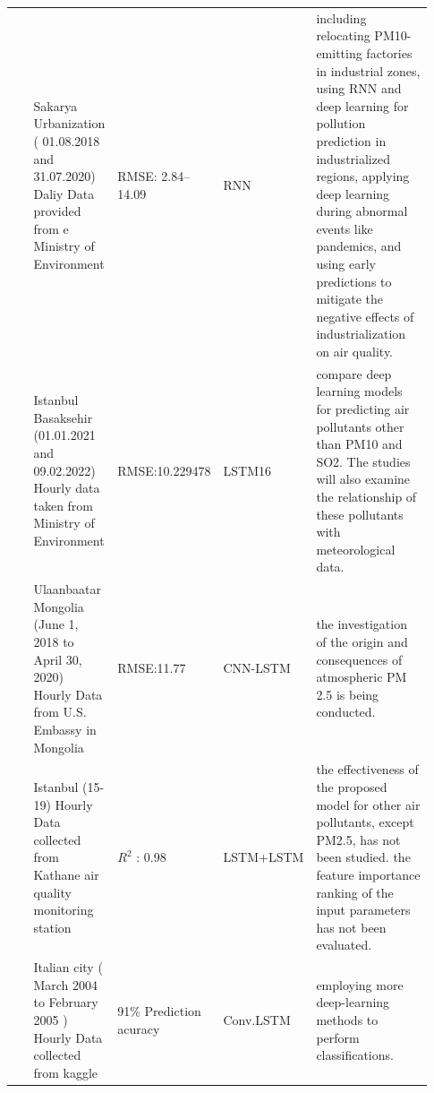 \documentclass[a4paper,fleqn]{cas-dc}
\begin{document}
\begin{landscape}
{\begin{longtable}[h!]{ p{0.1\linewidth} p{0.2\linewidth} p{0.14\linewidth} p{0.11\linewidth} p{0.38\linewidth} }
 \cite{kurnaz2022prediction}          & Sakarya Urbanization (   01.08.2018 and 31.07.2020) Daliy Data provided from e Ministry of Environment   & RMSE:  2.84–14.09                                                                                       & RNN                                                                 & including relocating PM10-emitting factories in industrial zones, using RNN and deep learning for pollution prediction in industrialized regions, applying deep learning during abnormal events like pandemics, and using early predictions to mitigate the negative effects of industrialization on air quality.                                                                 \\
 \cite{das2022prediction}           & Istanbul Basaksehir (01.01.2021   and 09.02.2022) Hourly data taken from Ministry of Environment         & RMSE:10.229478                                                                                          & LSTM16                                                              &compare deep learning models for predicting air pollutants other than PM10 and SO2. The studies will also examine the relationship of these pollutants with meteorological data.                                          \\
\cite{natsagdorj2023prediction}              & Ulaanbaatar Mongolia  (June 1, 2018 to  April 30, 2020) Hourly Data from U.S.   Embassy in Mongolia      & RMSE:11.77                                                                                              & CNN-LSTM                                                            & the investigation of the origin and consequences of atmospheric PM 2.5 is being conducted.                                     \\
 \cite{eren2023predicting}         & Istanbul (15-19) Hourly Data   collected from Kathane air quality monitoring station                     & $R^2$ : 0.98                                                                                               & LSTM+LSTM                                                           & the effectiveness of the proposed model for other air pollutants, except PM2.5, has not been studied. the feature importance ranking of the input parameters has not been evaluated.                                                                \\
\cite{zhu2023deep}           & Italian city ( March 2004 to   February 2005 ) Hourly Data collected from kaggle                         & 91\% Prediction acuracy                                                                                 & Conv.LSTM                                                           &  employing more deep-learning methods to perform classifications.                                                         \\

\end{longtable}}
\end{landscape}
\end{document}
